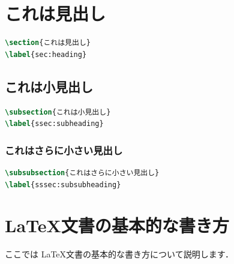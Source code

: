 \documentclass[
    paper=a4paper,      %
    article,            %
    fontsize=11pt,      %
    jafontsize=11pt,    %
    head_space=25mm,    %
    foot_space=25mm,    %
    gutter=20mm,        %
    fore-edge=20mm      %
    ]{jlreq}            %
\begin{document}
\makedocumenttitle

\thispagestyle{cover}

\tableofcontents
\clearpage

\section{これは見出し}
\label{sec:heading}

\begin{lstlisting}[language=TeX]
\section{これは見出し}
\label{sec:heading}
\end{lstlisting}

\subsection{これは小見出し}
\label{ssec:subheading}

\begin{lstlisting}[language=TeX]
\subsection{これは小見出し}
\label{ssec:subheading}
\end{lstlisting}

\subsubsection{これはさらに小さい見出し}
\label{sssec:subsubheading}

\begin{lstlisting}[language=TeX]
\subsubsection{これはさらに小さい見出し}
\label{sssec:subsubheading}
\end{lstlisting}

\section{\LaTeX 文書の基本的な書き方}

ここでは \LaTeX 文書の基本的な書き方について説明します．
\end{document}
